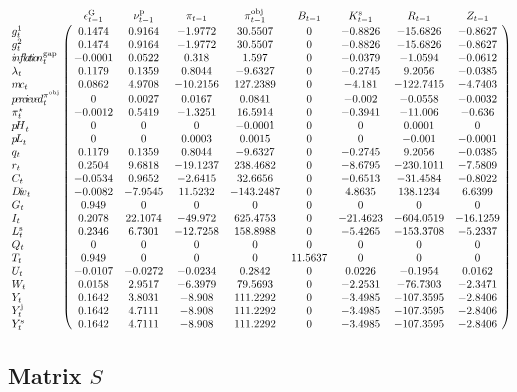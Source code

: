 $$\bordermatrix{
~ & \epsilon^{\mathrm{G}}_{t-1} & \nu^{\mathrm{p}}_{t-1} & \pi_{t-1} & \pi^{\mathrm{obj}}_{t-1} & B_{t-1} & K^{\mathrm{s}}_{t-1} & R_{t-1} & Z_{t-1} \cr
g^{\mathrm{1}}_{t} & 0.1474 & 0.9164 & -1.9772 & 30.5507 & 0 & -0.8826 & -15.6826 & -0.8627 \cr
g^{\mathrm{2}}_{t} & 0.1474 & 0.9164 & -1.9772 & 30.5507 & 0 & -0.8826 & -15.6826 & -0.8627 \cr
{i\!n\!f\!l\!a\!t\!i\!o\!n}^{\mathrm{gap}}_{t} & -0.0001 & 0.0522 & 0.318 & 1.597 & 0 & -0.0379 & -1.0594 & -0.0612 \cr
\lambda_{t} & 0.1179 & 0.1359 & 0.8044 & -9.6327 & 0 & -0.2745 & 9.2056 & -0.0385 \cr
{m\!c}_{t} & 0.0862 & 4.9708 & -10.2156 & 127.2389 & 0 & -4.181 & -122.7415 & -4.7403 \cr
{p\!e\!r\!c\!i\!e\!v\!e\!d}^{\pi^{\mathrm{obj}}}_{t} & 0 & 0.0027 & 0.0167 & 0.0841 & 0 & -0.002 & -0.0558 & -0.0032 \cr
\pi^{\star}_{t} & -0.0012 & 0.5419 & -1.3251 & 16.5914 & 0 & -0.3941 & -11.006 & -0.636 \cr
{p\!H}_{t} & 0 & 0 & 0 & -0.0001 & 0 & 0 & 0.0001 & 0 \cr
{p\!L}_{t} & 0 & 0 & 0.0003 & 0.0015 & 0 & 0 & -0.001 & -0.0001 \cr
q_{t} & 0.1179 & 0.1359 & 0.8044 & -9.6327 & 0 & -0.2745 & 9.2056 & -0.0385 \cr
r_{t} & 0.2504 & 9.6818 & -19.1237 & 238.4682 & 0 & -8.6795 & -230.1011 & -7.5809 \cr
C_{t} & -0.0534 & 0.9652 & -2.6415 & 32.6656 & 0 & -0.6513 & -31.4584 & -0.8022 \cr
{D\!i\!v}_{t} & -0.0082 & -7.9545 & 11.5232 & -143.2487 & 0 & 4.8635 & 138.1234 & 6.6399 \cr
G_{t} & 0.949 & 0 & 0 & 0 & 0 & 0 & 0 & 0 \cr
I_{t} & 0.2078 & 22.1074 & -49.972 & 625.4753 & 0 & -21.4623 & -604.0519 & -16.1259 \cr
L^{\mathrm{s}}_{t} & 0.2346 & 6.7301 & -12.7258 & 158.8988 & 0 & -5.4265 & -153.3708 & -5.2337 \cr
Q_{t} & 0 & 0 & 0 & 0 & 0 & 0 & 0 & 0 \cr
T_{t} & 0.949 & 0 & 0 & 0 & 11.5637 & 0 & 0 & 0 \cr
U_{t} & -0.0107 & -0.0272 & -0.0234 & 0.2842 & 0 & 0.0226 & -0.1954 & 0.0162 \cr
W_{t} & 0.0158 & 2.9517 & -6.3979 & 79.5693 & 0 & -2.2531 & -76.7303 & -2.3471 \cr
Y_{t} & 0.1642 & 3.8031 & -8.908 & 111.2292 & 0 & -3.4985 & -107.3595 & -2.8406 \cr
Y^{\mathrm{j}}_{t} & 0.1642 & 4.7111 & -8.908 & 111.2292 & 0 & -3.4985 & -107.3595 & -2.8406 \cr
Y^{\mathrm{s}}_{t} & 0.1642 & 4.7111 & -8.908 & 111.2292 & 0 & -3.4985 & -107.3595 & -2.8406 \cr
}$$

\subsection*{Matrix $S$}

